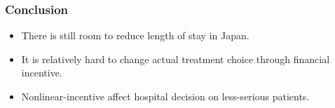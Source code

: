 \documentclass[14pt]{beamer}
\begin{document}
\begin{frame}
\frametitle{Conclusion}
\begin{itemize}
\item There is still room to reduce length of stay in Japan.
\item It is relatively hard to change actual treatment choice through financial incentive.
\item Nonlinear-incentive affect hospital decision on less-serious patients.
\end{itemize}

\end{frame}
\end{document}
